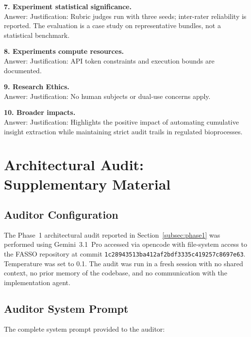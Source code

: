 \documentclass[11pt]{article}
\begin{document}
\textbf{7. Experiment statistical significance.}\\
Answer: \answerNA[Partial.] Justification: Rubric judges run with three seeds; inter-rater reliability is reported. The evaluation is a case study on representative bundles, not a statistical benchmark.

\textbf{8. Experiments compute resources.}\\
Answer: \answerYes Justification: API token constraints and execution bounds are documented.

\textbf{9. Research Ethics.}\\
Answer: \answerYes Justification: No human subjects or dual-use concerns apply.

\textbf{10. Broader impacts.}\\
Answer: \answerYes Justification: Highlights the positive impact of automating cumulative insight extraction while maintaining strict audit trails in regulated bioprocesses.


\section{Architectural Audit: Supplementary Material}
\label{appendix:audit}

\subsection{Auditor Configuration}

The Phase~1 architectural audit reported in Section~\ref{subsec:phase1}
was performed using Gemini~3.1~Pro accessed via opencode with
file-system access to the FASSO repository at commit
\texttt{1c28943513ba412af2bdf3335c419257c8697e63}. Temperature was set to 0.1. The audit
was run in a fresh session with no shared context, no prior memory of
the codebase, and no communication with the implementation agent.

\subsection{Auditor System Prompt}

The complete system prompt provided to the auditor:
\end{document}
